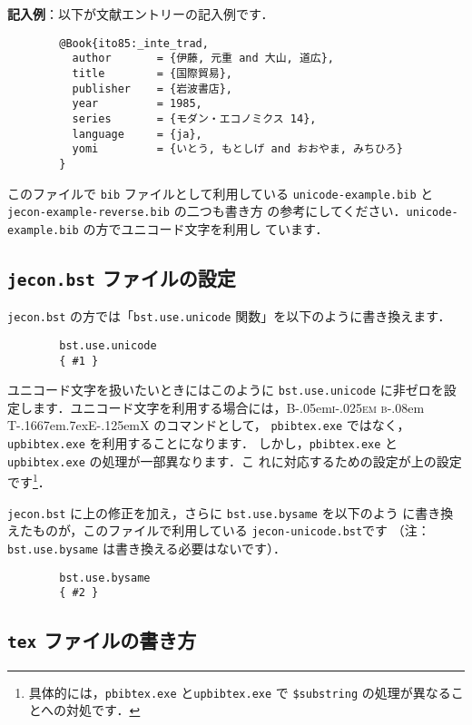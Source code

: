 \documentclass[article]{jlreq}
\newcommand{\BibTeX}{\textrm{B\kern-.05em\textsc{i\kern-.025em b}\kern-.08em%
    T\kern-.1667em\lower.7ex\hbox{E}\kern-.125emX}}
\begin{document}
\vspace*{1em}

\textbf{記入例}：以下が文献エントリーの記入例です．
\begin{verbatim}
        @Book{ito85:_inte_trad,
          author       = {伊藤, 元重 and 大山, 道広},
          title        = {国際貿易},
          publisher    = {岩波書店},
          year         = 1985,
          series       = {モダン・エコノミクス 14},
          language     = {ja},
          yomi         = {いとう, もとしげ and おおやま, みちひろ}
        }
\end{verbatim}

このファイルで \texttt{bib} ファイルとして利用している
\texttt{unicode-example.bib} と \texttt{jecon-example-reverse.bib} の二つも書き方
の参考にしてください．\texttt{unicode-example.bib} の方でユニコード文字を利用し
ています．

\subsection{\texttt{jecon.bst} ファイルの設定}

\texttt{jecon.bst} の方では「\texttt{bst.use.unicode} 関数」を以下のように書き換えます．
\begin{verbatim}
        bst.use.unicode
        { #1 }
\end{verbatim}

ユニコード文字を扱いたいときにはこのように \texttt{bst.use.unicode} に非ゼロを設
定します．ユニコード文字を利用する場合には，\BibTeX{} のコマンドとして，
\texttt{pbibtex.exe} ではなく，\texttt{upbibtex.exe} を利用することになります．
しかし，\texttt{pbibtex.exe} と \texttt{upbibtex.exe} の処理が一部異なります．こ
れに対応するための設定が上の設定です\footnote{具体的には，\texttt{pbibtex.exe}
と\texttt{upbibtex.exe} で \texttt{\$substring} の処理が異なることへの対処です．}．
 
\vspace*{1em}

\texttt{jecon.bst} に上の修正を加え，さらに \texttt{bst.use.bysame} を以下のよう
に書き換えたものが，このファイルで利用している \texttt{jecon-unicode.bst}です
（注：\texttt{bst.use.bysame} は書き換える必要はないです）．
\begin{verbatim}
        bst.use.bysame
        { #2 }
\end{verbatim}

\subsection{\texttt{tex} ファイルの書き方}
\end{document}
